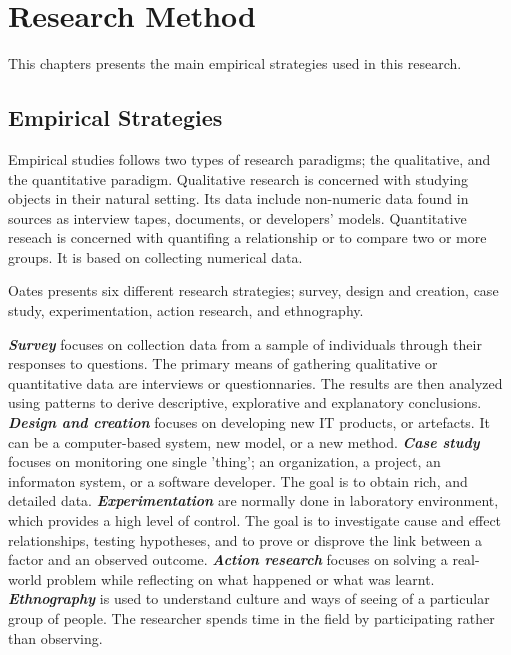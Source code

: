 \chapter{Research Method}
This chapters presents the main empirical strategies used in this research.

\section{Empirical Strategies}
Empirical studies follows two types of research paradigms; the qualitative, and the quantitative paradigm\cite{Wohlin:2000:ESE:330775}. Qualitative research is concerned with studying objects in their natural setting\cite{Wohlin:2000:ESE:330775}. Its data include non-numeric data found in sources as interview tapes, documents, or developers' models\cite{Oates:2006:RIS:1202299}. Quantitative reseach is concerned with quantifing a relationship or to compare two or more groups\cite{Wohlin:2000:ESE:330775}. It is based on collecting numerical data\cite{Oates:2006:RIS:1202299}.

Oates\cite{Oates:2006:RIS:1202299} presents six different research strategies; survey, design and creation, case study, experimentation, action research, and ethnography. 

\textit{\textbf{Survey}} focuses on collection data from a sample of individuals through their responses to questions. The primary means of gathering qualitative or quantitative data are interviews or questionnaries. The results are then analyzed using patterns to derive descriptive, explorative and explanatory conclusions. \textit{\textbf{Design and creation}} focuses on developing new IT products, or artefacts. It can be a computer-based system, new model, or a new method. \textit{\textbf{Case study}} focuses on monitoring one single 'thing'; an organization, a project, an informaton system, or a software developer. The goal is to obtain rich, and detailed data. \textit{\textbf{Experimentation}} are normally done in laboratory environment, which provides a high level of control. The goal is to investigate cause and effect relationships, testing hypotheses, and to prove or disprove the link between a factor and an observed outcome. \textit{\textbf{Action research}} focuses on solving a real-world problem while reflecting on what happened or what was learnt. \textit{\textbf{Ethnography}} is used to understand culture and ways of seeing of a particular group of people. The researcher spends time in the field by participating rather than observing.

